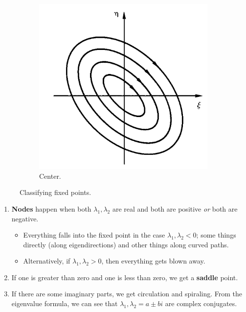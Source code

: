 \documentclass[../notes.tex]{subfiles}
\begin{document}
\begin{itemize}
\begin{figure}[h!]
\begin{subfigure}[b]{0.24\linewidth}
        \end{subfigure}
        \begin{subfigure}[b]{0.24\linewidth}
            \centering
            \includegraphics[width=0.95\linewidth]{../ExtFiles/classifyFixedPointsd.png}
            \caption{Center.}
            \label{fig:classifyFixedPointd}
        \end{subfigure}
        \caption{Classifying fixed points.}
        \label{fig:classifyFixedPoint}
    \end{figure}
    \begin{enumerate}
        \item \textbf{Nodes} happen when both $\lambda_1,\lambda_2$ are real and both are positive \emph{or} both are negative.
        \begin{itemize}
            \item Everything falls into the fixed point in the case $\lambda_1,\lambda_2<0$; some things directly (along eigendirections) and other things along curved paths.
            \item Alternatively, if $\lambda_1,\lambda_2>0$, then everything gets blown away.
        \end{itemize}
        \item If one is greater than zero and one is less than zero, we get a \textbf{saddle} point.
        \item If there are some imaginary parts, we get circulation and spiraling. From the eigenvalue formula, we can see that $\lambda_1,\lambda_2=a\pm bi$ are complex conjugates.

\end{enumerate}
\end{itemize}
\end{document}
